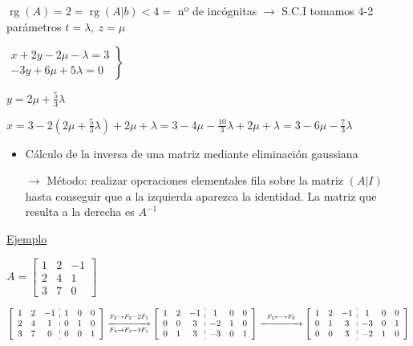 \documentclass[12pt]{article}
\DeclareMathOperator{\rg}{rg}
\begin{document}
\begin{wrapfigure}{r}{0.3\textwidth}
\end{wrapfigure}

$\rg(A)=2=\rg(A|b)<4=$ nº de incógnitas $\longrightarrow$ S.C.I
tomamos 4-2 parámetros $t=\lambda,~z=\mu$

$\left.\begin{array}{r}
x+2y-2\mu-\lambda=3\\
-3y+6\mu+5\lambda=0
\end{array}\right\rbrace$

$y=2\mu+\frac{5}{3}\lambda$

$x=3-2\left(2\mu+\frac{5}{3}\lambda\right)+2\mu+\lambda=3-4\mu-\frac{10}{3}\lambda+2\mu+\lambda=3-6\mu-\frac{7}{3}\lambda$

\begin{itemize}[label=\color{red}\textbullet, leftmargin=*]
\item \color{lightblue} Cálculo de la inversa de una matriz
mediante eliminación gaussiana
\end{itemize}

\begin{itemize}
\item[$\longrightarrow$] Método: realizar operaciones
elementales fila sobre la matriz $(A|I)$ hasta conseguir que a
la izquierda aparezca la identidad. La matriz que resulta a la
derecha es $A^{-1}$
\end{itemize}

\underline{Ejemplo}

$A=\begin{bmatrix}
1 & 2 & -1 \\ 
2 & 4 & 1 \\ 
3 & 7 & 0
\end{bmatrix} $

$\left[\begin{array}{ccc:ccc}
1 & 2 & -1 & 1 & 0 & 0 \\ 
2 & 4 & 1 & 0 & 1 & 0 \\ 
3 & 7 & 0 & 0 & 0 & 1
\end{array} \right]\overset{F_2\rightarrow
F_2-2F_1}{\underset{F_3\rightarrow
F_3-3F_1}{\xrightarrow{\hspace{1.5cm}}}}\left[\begin{array}{ccc:ccc}
1 & 2 & -1 & 1 & 0 & 0 \\ 
0 & 0 & 3 & -2 & 1 & 0 \\ 
0 & 1 & 3 & -3 & 0 & 1
\end{array} \right]\overset{F_2\longleftrightarrow
F_3}{\xrightarrow{\hspace{1.5cm}}}\left[\begin{array}{ccc:ccc}
1 & 2 & -1 & 1 & 0 & 0 \\ 
0 & 1 & 3 & -3 & 0 & 1 \\ 
0 & 0 & 3 & -2 & 1 & 0
\end{array} \right]$
\end{document}
